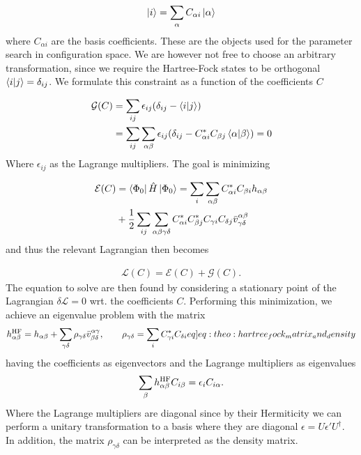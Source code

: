 \begin{align*}
    \ket{i} = \sum_{\alpha} C_{\alpha i}\ket{\alpha}
\end{align*}
where $C_{\alpha i}$ are the basis coefficients. These are the objects used for the parameter search in configuration space. We are however not free to choose an arbitrary transformation, since we require the Hartree-Fock states to be orthogonal $\braket{i}{j} = \delta_{ij}$. We formulate this constraint as a function of the coefficients $C$ 

\begin{align*}
    \mathcal{G}(C) &= \sum_{ij} \epsilon_{ij} (\delta_{ij} - \ip{i}{j}) \\
                    &= \sum_{ij}\sum_{\alpha\beta} \epsilon_{ij} (\delta_{ij} - C^*_{\alpha i} C_{\beta j} \ip{\alpha}{\beta}) = 0
\end{align*}
Where $\epsilon_{ij}$ as the Lagrange multipliers. The goal is minimizing 

\begin{align*}
    \mathcal{E}(C) &= \bra{\Phi_0} \hat{H} \ket{\Phi_0} = \sum_{i} \sum_{\alpha\beta} C_{\alpha i}^* C_{\beta i} h_{\alpha\beta} \\
    &+ \frac{1}{2}\sum_{ij}\sum_{\alpha\beta\gamma\delta} C_{\alpha i}^* C_{\beta j}^* C_{\gamma i} C_{\delta j} \bar{v}^{\alpha \beta}_{\gamma \delta}
\end{align*}
and thus the relevant Lagrangian then becomes

\begin{align*}
    \mathcal{L}(C) = \mathcal{E}(C) + \mathcal{G}(C).
\end{align*}
The equation to solve are then found by considering a stationary point of the Lagrangian $\delta \mathcal{L} = 0$ wrt. the coefficients $C$. Performing this minimization, we achieve an eigenvalue problem with the matrix
\begin{align}
    \hamhf{\alpha\beta} = \hshort{\alpha}{\beta} + \sum_{\gamma\delta} \rho_{\gamma\delta} \elmASshort{\alpha\gamma}{\beta \delta}, \hspace{20px} \rho_{\gamma\delta} = \sum_i C^*_{\gamma i} C_{\delta i} \label[eq]{eq:theo:hartree_fock_matrix_and_density} 
\end{align}
having the coefficients as eigenvectors and the Lagrange multipliers as eigenvalues
\begin{align}
    \sum_{\beta} h^{\text{HF}}_{\alpha \beta} C_{i \beta} = \epsilon_i C_{i \alpha}. \label{eq:theo:hartreefock_eigenvalueproblem}
\end{align}
Where the Lagrange multipliers are diagonal since by their Hermiticity we can perform a unitary transformation to a basis where they are diagonal $\epsilon = U \epsilon' U^\dagger$. In addition, the matrix $\rho_{\gamma \delta}$ can be interpreted as the density matrix.
 
